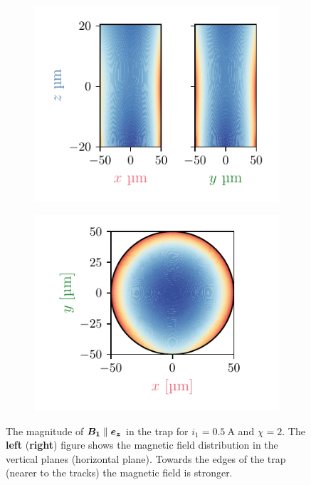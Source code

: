 \begin{figure}
    \centering
    \begin{subfigure}{0.5\textwidth}
        \includegraphics{figures/data/magnetic_field_distribution_in_trap_vertical.pdf}
    \end{subfigure}%
    \begin{subfigure}{0.5\textwidth}
        \includegraphics{figures/data/magnetic_field_distribution_in_trap_horizontal.pdf}
    \end{subfigure}
    \caption{The magnitude of $\bm{B_1} \parallel \bm{e_z}$ in the trap for $i_1=\qty{0.5}{\ampere}$ and $\chi=2$. The \textbf{left} (\textbf{right}) figure shows the magnetic field distribution in the vertical planes (horizontal plane). Towards the edges of the trap (nearer to the tracks) the magnetic field is stronger.}
    \label{fig:magnetic-field-distribution}
\end{figure}

